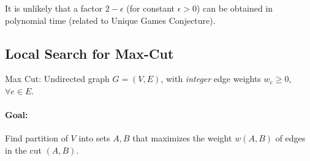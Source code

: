 It is unlikely that a factor $2 - \epsilon$ (for constant $\epsilon > 0$) can be obtained in polynomial time (related to Unique Games Conjecture).

\subsection{Local Search for Max-Cut}

\noindent Max Cut: Undirected graph $G=(V,E)$, with \emph{integer} edge weights $w_e \ge 0$, $\forall e \in E$.

\paragraph{Goal:} Find partition of $V$ into sets $A,B$ that maximizes the weight $w(A,B)$ of edges in the cut $(A,B)$.

